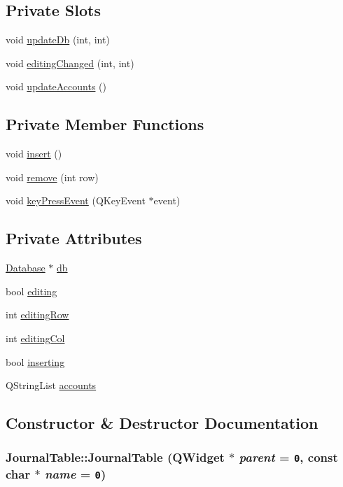\subsection*{Private Slots}
\begin{CompactItemize}
\item 
void \hyperlink{classJournalTable_k0}{update\-Db} (int, int)
\item 
void \hyperlink{classJournalTable_k1}{editing\-Changed} (int, int)
\item 
void \hyperlink{classJournalTable_k2}{update\-Accounts} ()
\end{CompactItemize}
\subsection*{Private Member Functions}
\begin{CompactItemize}
\item 
void \hyperlink{classJournalTable_d0}{insert} ()
\item 
void \hyperlink{classJournalTable_d1}{remove} (int row)
\item 
void \hyperlink{classJournalTable_d2}{key\-Press\-Event} (QKey\-Event $\ast$event)
\end{CompactItemize}
\subsection*{Private Attributes}
\begin{CompactItemize}
\item 
\hyperlink{classDatabase}{Database} $\ast$ \hyperlink{classJournalTable_r0}{db}
\item 
bool \hyperlink{classJournalTable_r1}{editing}
\item 
int \hyperlink{classJournalTable_r2}{editing\-Row}
\item 
int \hyperlink{classJournalTable_r3}{editing\-Col}
\item 
bool \hyperlink{classJournalTable_r4}{inserting}
\item 
QString\-List \hyperlink{classJournalTable_r5}{accounts}
\end{CompactItemize}


\subsection{Constructor \& Destructor Documentation}
\hypertarget{classJournalTable_a0}{
\subsubsection[JournalTable]{\setlength{\rightskip}{0pt plus 5cm}Journal\-Table::Journal\-Table (QWidget $\ast$ {\em parent} = {\tt 0}, const char $\ast$ {\em name} = {\tt 0})}}
\label{classJournalTable_a0}


